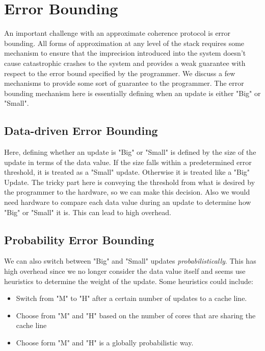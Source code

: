 \section{Error Bounding}

An important challenge with an approximate coherence protocol is error bounding.
All forms of approximation at any level of the stack requires some mechanism to
ensure that the imprecision introduced into the system doesn't cause
catastrophic crashes to the system and provides a weak guarantee with respect
to the error bound specified by the programmer. We discuss a few mechanisms to
provide some sort of guarantee to the programmer. The error bounding mechanism
here is essentially defining when an update is either "Big" or "Small". 

\subsection{Data-driven Error Bounding}  
Here, defining whether an update is "Big" or "Small" is defined by the size of
the update in terms of the data value. If the size falls within a predetermined
error threshold, it is treated as a "Small" update. Otherwise it is treated like
a "Big" Update. The tricky part here is conveying the threshold from what is 
desired by the programmer to the hardware, so we can make this decision. Also we
would need hardware to compare each data value during an update to determine how
"Big" or "Small" it is. This can lead to high overhead. 

\subsection{Probability Error Bounding}  
We can also switch between "Big" and "Small" updates \emph{probabilistically}.
This has high overhead since we no longer consider the data value itself and
seems use heuristics to determine the weight of the update. Some heuristics
could include: 
\begin{itemize}
\item Switch from "M" to "H" after a certain number of updates to a cache line.
\item Choose from "M" and "H" based on the number of cores that are sharing the
cache line
\item Choose form "M" and "H" is a globally probabilistic way.

\end{itemize}
